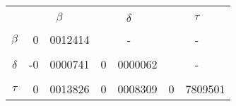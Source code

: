 		

		\begin{tabular}{cr@{.}lr@{.}lr@{.}l}
		& \multicolumn{2}{c}{ } & \multicolumn{2}{c}{ } & \multicolumn{2}{c}{ } \\
		& \multicolumn{2}{c}{{\bf{$\beta$}}} & \multicolumn{2}{c}{{\bf{$\delta$}}} & \multicolumn{2}{c}{{\bf{$\tau$}}} \\
		& \multicolumn{2}{c}{ } & \multicolumn{2}{c}{ } & \multicolumn{2}{c}{ } \\
		{\bf{$\beta$}} &			 0&0012414		&	\multicolumn{2}{c}{ - }		&  \multicolumn{2}{c}{ - }	\\
		& \multicolumn{2}{c}{ } & \multicolumn{2}{c}{ } & \multicolumn{2}{c}{ } \\
		 {\bf{$\delta$}} &			-0&0000741		&	0&0000062				& \multicolumn{2}{c}{ - } \\
		& \multicolumn{2}{c}{ } & \multicolumn{2}{c}{ } & \multicolumn{2}{c}{ } \\
		 {\bf{$\tau$}} &			0&0013826		&	0&0008309				& 0&7809501 \\
		\end{tabular}


